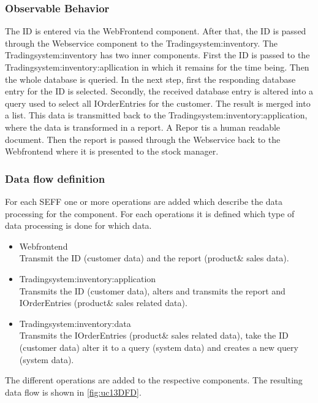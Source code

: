 \subsubsection{Observable Behavior}
The ID is entered via the WebFrontend component. After that, the ID is passed through the Webservice component to the Tradingsystem:inventory. The Tradingsystem:inventory has two inner components. First the ID is passed to the Tradingsystem:inventory:apllication in which it remains for the time being. Then the whole database is queried. In the next step, first the responding database entry for the ID is selected. Secondly, the received database entry is altered into a query used to select all IOrderEntries for the customer. The result is merged into a list. This data is transmitted back to the Tradingsystem:inventory:application, where the data is transformed in a report. A Repor tis a human readable document. Then the report is passed through the Webservice back to the Webfrontend where it is presented to the stock manager.
\subsubsection{Data flow definition}
For each SEFF one or more operations are added which describe the data processing for the component. For each operations it is defined which type of data processing is done for which data.
\begin{itemize}
\item Webfrontend \\ Transmit the ID (customer data) and the report (product\& sales data).
\item Tradingsystem:inventory:application \\ Transmits the ID (customer data), alters and transmits the report and IOrderEntries (product\& sales related data).
\item Tradingsystem:inventory:data \\ Transmits the IOrderEntries (product\& sales related data), take the ID (customer data) alter it to a query (system data) and creates a new query (system data).
\end{itemize}
The different operations are added to the respective components. The resulting data flow is shown in \autoref{fig:uc13DFD}.

